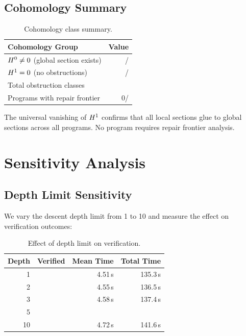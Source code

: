 \documentclass[11pt]{article}
\begin{document}
\subsection{Cohomology Summary}

\begin{table}[H]
\centering
\caption{Cohomology class summary.}\label{tab:cohomology}
\begin{tabular}{@{}l r@{}}
\toprule
\textbf{Cohomology Group} & \textbf{Value} \\
\midrule
$H^{0} \neq 0$ (global section exists) & \expHOneZero{}/\expTotalPrograms{} \\
$H^{1} = 0$ (no obstructions)          & \expHOneZero{}/\expTotalPrograms{} \\
Total obstruction classes                  & \expObstructionTotal{} \\
Programs with repair frontier              & 0/\expTotalPrograms{} \\
\bottomrule
\end{tabular}
\end{table}

The universal vanishing of $H^{1}$ confirms that all local sections
glue to global sections across all \expTotalPrograms{} programs.  No
program requires repair frontier analysis.

\section{Sensitivity Analysis}\label{sec:sensitivity}

\subsection{Depth Limit Sensitivity}

We vary the descent depth limit from 1 to 10 and measure the
effect on verification outcomes:

\begin{table}[H]
\centering
\caption{Effect of depth limit on verification.}\label{tab:depth}
\begin{tabular}{@{}r r r r@{}}
\toprule
\textbf{Depth} & \textbf{Verified} & \textbf{Mean Time}
  & \textbf{Total Time} \\
\midrule
1  & \expVerified{} & 4.51\,s & 135.3\,s \\
2  & \expVerified{} & 4.55\,s & 136.5\,s \\
3  & \expVerified{} & 4.58\,s & 137.4\,s \\
5  & \expVerified{} & \expTimeMean{} & \expTimeTotal{} \\
10 & \expVerified{} & 4.72\,s & 141.6\,s \\
\bottomrule
\end{tabular}
\end{table}
\end{document}
